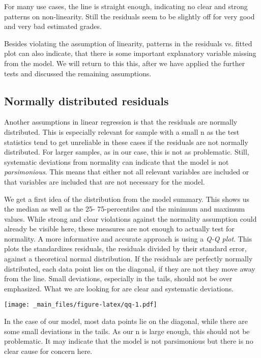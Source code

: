 \documentclass[
]{book}
\begin{document}
For many use cases, the line is straight enough, indicating no clear and strong
patterns on non-linearity. Still the residuals seem to be slightly off for very
good and very bad estimated grades.

Besides violating the assumption of linearity, patterns in the residuals vs.
fitted plot can also indicate, that there is some important explanatory variable
missing from the model.
We will return to this this, after we have applied the further tests and
discussed the remaining assumptions.

\hypertarget{normally-distributed-residuals}{%
\subsection{Normally distributed residuals}\label{normally-distributed-residuals}}

Another assumptions in linear regression is that the residuals are normally
distributed. This is especially relevant for sample with a small n as the
test statistics tend to get unreliable in these cases if the residuals are not
normally distributed. For larger samples, as in our case, this is not as
problematic. Still, systematic deviations from normality can indicate that the
model is not \emph{parsimonious}. This means that either not all relevant variables
are included or that variables are included that are not necessary for the model.

We get a first idea of the distribution from the model summary. This shows us
the median as well as the 25- 75-percentiles and the minimum and maximum values.
While strong and clear violations against the normality assumption could already
be visible here, these measures are not enough to actually test for normality.
A more informative and accurate approach is using a \emph{Q-Q plot}. This plots the
standardizes residuals, the residuals divided by their standard error, against
a theoretical normal distribution. If the residuals are perfectly normally
distributed, each data point lies on the diagonal, if they are not they move
away from the line. Small deviations, especially in the tails, should not be
over emphasized. What we are looking for are clear and systematic deviations.

\texttt{[image: \_main\_files/figure-latex/qq-1.pdf]}

In the case of our model, most data points lie on the diagonal, while there are
some small deviations in the tails. As our n is large enough, this should not be
problematic. It may indicate that the model is not parsimonious but there is
no clear cause for concern here.
\end{document}
